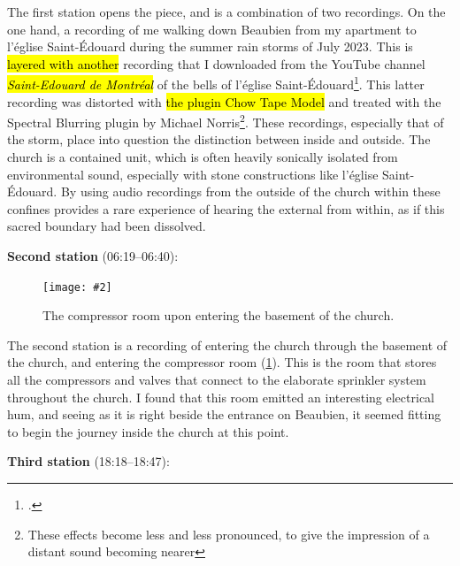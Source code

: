 \documentclass[12pt,twoside,maitrise]{dms_ks}
\newcommand{\customincludegraphics}[4][]{%
    \begin{figure}[H]
        \centering
        \texttt{[image: \#2]}
        \caption{#4}
	\label{#3} 
    \end{figure}
}
\theoremstyle{definition}
\begin{document}
{The first station opens the piece, and is a combination of two recordings. 
On the one hand, a recording of me walking down Beaubien from my apartment to l'église Saint-Édouard during the summer rain storms of July 2023. 
This is \hl{layered with another} recording that I downloaded from the YouTube channel \hl{\textit{Saint-Edouard de Montréal}} of the bells of l'église Saint-Édouard\footcite{saint-edouard_de_montreal_volee_2022}. 
This latter recording was distorted with \hl{the plugin Chow Tape Model} and treated with the Spectral Blurring plugin by Michael Norris\footnote{These effects become less and less pronounced, to give the impression of a distant sound becoming nearer}. 
These recordings, especially that of the storm, place into question the distinction between inside and outside. 
The church is a contained unit, which is often heavily sonically isolated from environmental sound, especially with stone constructions like l'église Saint-Édouard. 
By using audio recordings from the outside of the church within these confines provides a rare experience of hearing the external from within, as if this sacred boundary had been dissolved.


\textbf{Second station} (06:19--06:40):

\customincludegraphics[scale=0.25]{DSC00149_1.JPG}{fig:station2}{The compressor room upon entering the basement of the church.}%

The second station is a recording of entering the church through the basement of the church, and entering the compressor room (\cref{fig:station2}). 
This is the room that stores all the compressors and valves that connect to the elaborate sprinkler system throughout the church. 
I found that this room emitted an interesting electrical hum, and seeing as it is right beside the entrance on Beaubien, it seemed fitting to begin the journey inside the church at this point.

\textbf{Third station} (18:18--18:47):

}
\end{document}
